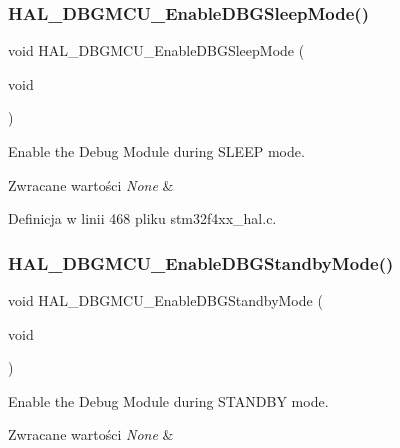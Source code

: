 \subsubsection{\texorpdfstring{H\+A\+L\+\_\+\+D\+B\+G\+M\+C\+U\+\_\+\+Enable\+D\+B\+G\+Sleep\+Mode()}{HAL\_DBGMCU\_EnableDBGSleepMode()}}
{\footnotesize\ttfamily void H\+A\+L\+\_\+\+D\+B\+G\+M\+C\+U\+\_\+\+Enable\+D\+B\+G\+Sleep\+Mode (\begin{DoxyParamCaption}\item[{void}]{ }\end{DoxyParamCaption})}



Enable the Debug Module during S\+L\+E\+EP mode. 


\begin{DoxyRetVals}{Zwracane wartości}
{\em None} & \\
\hline
\end{DoxyRetVals}


Definicja w linii 468 pliku stm32f4xx\+\_\+hal.\+c.

\mbox{\label{group___h_a_l___exported___functions___group2_ga28a1323b2eeb0a408c1cfdbfa0db5ead}} 
\subsubsection{\texorpdfstring{H\+A\+L\+\_\+\+D\+B\+G\+M\+C\+U\+\_\+\+Enable\+D\+B\+G\+Standby\+Mode()}{HAL\_DBGMCU\_EnableDBGStandbyMode()}}
{\footnotesize\ttfamily void H\+A\+L\+\_\+\+D\+B\+G\+M\+C\+U\+\_\+\+Enable\+D\+B\+G\+Standby\+Mode (\begin{DoxyParamCaption}\item[{void}]{ }\end{DoxyParamCaption})}



Enable the Debug Module during S\+T\+A\+N\+D\+BY mode. 


\begin{DoxyRetVals}{Zwracane wartości}
{\em None} & \\
\hline
\end{DoxyRetVals}


